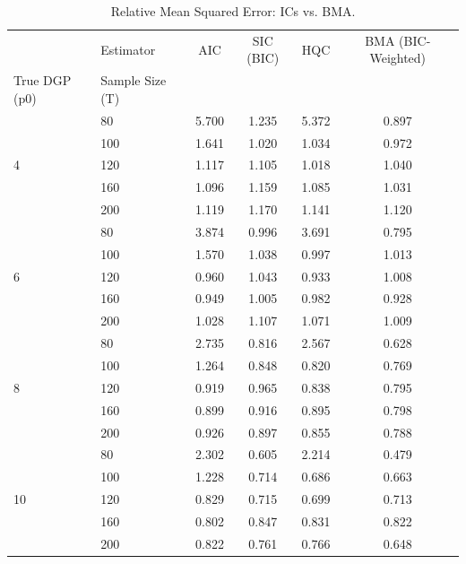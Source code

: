 \begin{table}[htbp]
\centering
\caption{Relative Mean Squared Error: ICs vs. BMA.}
\label{tab:bma_vs_ic}
\begin{tabular}{llcccc}
\toprule
 & Estimator & AIC & SIC (BIC) & HQC & BMA (BIC-Weighted) \\
True DGP (p0) & Sample Size (T) &  &  &  &  \\
\midrule
\multirow[t]{5}{*}{4} & 80 & 5.700 & 1.235 & 5.372 & 0.897 \\
 & 100 & 1.641 & 1.020 & 1.034 & 0.972 \\
 & 120 & 1.117 & 1.105 & 1.018 & 1.040 \\
 & 160 & 1.096 & 1.159 & 1.085 & 1.031 \\
 & 200 & 1.119 & 1.170 & 1.141 & 1.120 \\
\multirow[t]{5}{*}{6} & 80 & 3.874 & 0.996 & 3.691 & 0.795 \\
 & 100 & 1.570 & 1.038 & 0.997 & 1.013 \\
 & 120 & 0.960 & 1.043 & 0.933 & 1.008 \\
 & 160 & 0.949 & 1.005 & 0.982 & 0.928 \\
 & 200 & 1.028 & 1.107 & 1.071 & 1.009 \\
\multirow[t]{5}{*}{8} & 80 & 2.735 & 0.816 & 2.567 & 0.628 \\
 & 100 & 1.264 & 0.848 & 0.820 & 0.769 \\
 & 120 & 0.919 & 0.965 & 0.838 & 0.795 \\
 & 160 & 0.899 & 0.916 & 0.895 & 0.798 \\
 & 200 & 0.926 & 0.897 & 0.855 & 0.788 \\
\multirow[t]{5}{*}{10} & 80 & 2.302 & 0.605 & 2.214 & 0.479 \\
 & 100 & 1.228 & 0.714 & 0.686 & 0.663 \\
 & 120 & 0.829 & 0.715 & 0.699 & 0.713 \\
 & 160 & 0.802 & 0.847 & 0.831 & 0.822 \\
 & 200 & 0.822 & 0.761 & 0.766 & 0.648 \\
\bottomrule
\end{tabular}
\end{table}
